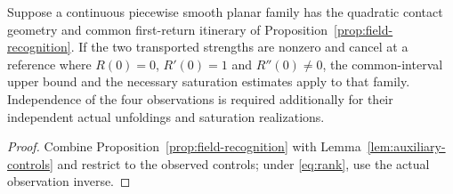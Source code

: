 \begin{corollary}\label{cor:field-criterion}
Suppose a continuous piecewise smooth planar family has the quadratic
contact geometry and common first-return itinerary of
Proposition~\ref{prop:field-recognition}. If the two transported strengths
are nonzero and cancel at a reference where $R(0)=0$, $R'(0)=1$ and
$R''(0)\ne0$, the common-interval upper bound and the necessary
saturation estimates apply to that family. Independence of the four
observations is required additionally for their independent actual
unfoldings and saturation realizations.
\end{corollary}

\begin{proof}
Combine Proposition~\ref{prop:field-recognition} with
Lemma~\ref{lem:auxiliary-controls} and restrict to the observed controls;
under \eqref{eq:rank}, use the actual observation inverse.
\end{proof}
